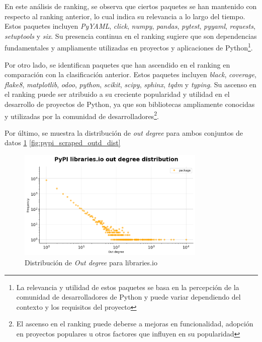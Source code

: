 En este análisis de ranking, se observa que ciertos paquetes se han mantenido con respecto al ranking
anterior, lo cual indica su relevancia a lo largo del tiempo. Estos
paquetes incluyen \textit{PyYAML}, \textit{click}, \textit{numpy}, \textit{pandas}, \textit{pytest},
\textit{pyyaml}, \textit{requests}, \textit{setuptools} y \textit{six}. Su presencia continua en el
ranking sugiere que son dependencias fundamentales y ampliamente utilizadas en proyectos y aplicaciones
de Python\footnote{La relevancia y utilidad de estos paquetes se basa en la percepción de la comunidad
    de desarrolladores de Python y puede variar dependiendo del contexto y los requisitos del proyecto}.

Por otro lado, se identifican paquetes que han ascendido en el ranking en comparación con la clasificación
anterior. Estos paquetes incluyen \textit{black}, \textit{coverage}, \textit{flake8}, \textit{matplotlib},
\textit{odoo}, \textit{python}, \textit{scikit}, \textit{scipy}, \textit{sphinx}, \textit{tqdm} y
\textit{typing}. Su ascenso en el ranking puede ser atribuido a su creciente popularidad y utilidad en el
desarrollo de proyectos de Python, ya que son bibliotecas ampliamente conocidas y utilizadas por la
comunidad de desarrolladores\footnote{El ascenso en el ranking puede deberse a mejoras en funcionalidad,
    adopción en proyectos populares u otros factores que influyen en su popularidad}.

Por último, se muestra la distribución de \textit{out degree} para ambos conjuntos de datos \ref{fig:pypi_libio_outd_dist} \ref{fig:pypi_scraped_outd_dist}

\begin{figure}[h!]
    \begin{center}
        \includegraphics[width=0.8\textwidth]{img/pypi/outd_libio_dist.png}
        \caption{Distribución de \textit{Out degree} para libraries.io}
        \label{fig:pypi_libio_outd_dist}
    \end{center}
\end{figure}

